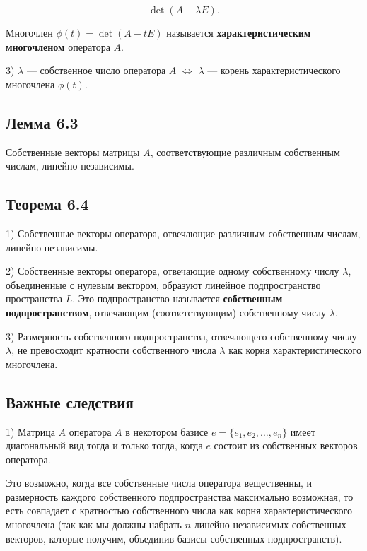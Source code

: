 {\[
\det(A - \lambda E).
\]



Многочлен \( \phi(t) = \det(A - tE) \) называется \textbf{характеристическим многочленом} оператора \( A \).

3) \( \lambda \) — собственное число оператора \( A \) \( \iff \) \( \lambda \) — корень характеристического многочлена \( \phi(t) \).

\subsection*{Лемма 6.3}

Собственные векторы матрицы \( A \), соответствующие различным собственным числам, линейно независимы.

\subsection*{Теорема 6.4}

1) Собственные векторы оператора, отвечающие различным собственным числам, линейно независимы.

2) Собственные векторы оператора, отвечающие одному собственному числу \( \lambda \), объединенные с нулевым вектором, образуют линейное подпространство пространства \( L \). Это подпространство называется \textbf{собственным подпространством}, отвечающим (соответствующим) собственному числу \( \lambda \).

3) Размерность собственного подпространства, отвечающего собственному числу \( \lambda \), не превосходит кратности собственного числа \( \lambda \) как корня характеристического многочлена.

\subsection*{Важные следствия}

1) Матрица \( A \) оператора \( A \) в некотором базисе \( e = \{e_1, e_2, \dots, e_n\} \) имеет диагональный вид тогда и только тогда, когда \( e \) состоит из собственных векторов оператора.

Это возможно, когда все собственные числа оператора вещественны, и размерность каждого собственного подпространства максимально возможная, то есть совпадает с кратностью собственного числа как корня характеристического многочлена (так как мы должны набрать \( n \) линейно независимых собственных векторов, которые получим, объединив базисы собственных подпространств).

}
